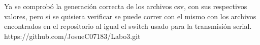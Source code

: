 Ya se comprobó la generación correcta de los archivos csv, con sus respectivos valores, pero si se quisiera verificar se puede correr con el mismo con los archivos encontrados en el repositorio al igual el switch usado para la transmisión serial.\\
https://github.com/JosueC07183/Labo3.git

\newpage